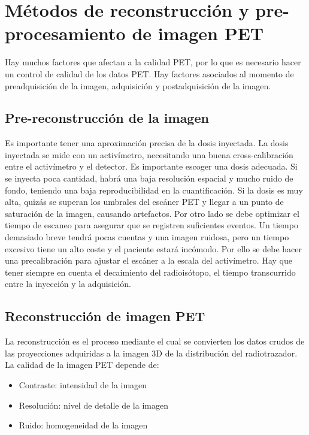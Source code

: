 \section{Métodos de reconstrucción y pre-procesamiento de imagen PET}

Hay muchos factores que afectan a la calidad PET, por lo que es necesario hacer un control de calidad de los datos PET. Hay factores asociados al momento de preadquisición de la imagen, adquisición y postadquisición de la imagen.

\subsection{Pre-reconstrucción de la imagen}
Es importante tener una aproximación precisa de la dosis inyectada. La dosis inyectada se mide con un activímetro, necesitando una buena cross-calibración entre el activímetro y el detector. Es importante escoger una dosis adecuada. Si se inyecta poca cantidad, habrá una baja resolución espacial y mucho ruido de fondo, teniendo una baja reproducibilidad en la cuantificación. Si la dosis es muy alta, quizás se superan los umbrales del escáner PET y llegar a un punto de saturación de la imagen, causando artefactos. Por otro lado se debe optimizar el tiempo de escaneo para asegurar que se registren suficientes eventos. Un tiempo demasiado breve tendrá pocas cuentas y una imagen ruidosa, pero un tiempo excesivo tiene un alto coste y el paciente estará incómodo. Por ello se debe hacer una precalibración para ajustar el escáner a la escala del activímetro. Hay que tener siempre en cuenta el decaimiento del radioisótopo, el tiempo transcurrido entre la inyección y la adquisición. 

\subsection{Reconstrucción de imagen PET}
La reconstrucción es el proceso mediante el cual se convierten los datos crudos de las proyecciones adquiridas a la imagen 3D de la distribución del radiotrazador. La calidad de la imagen PET depende de:
\begin{itemize}
\item Contraste: intensidad de la imagen
\item Resolución: nivel de detalle de la imagen
\item Ruido: homogeneidad de la imagen
\end{itemize}

